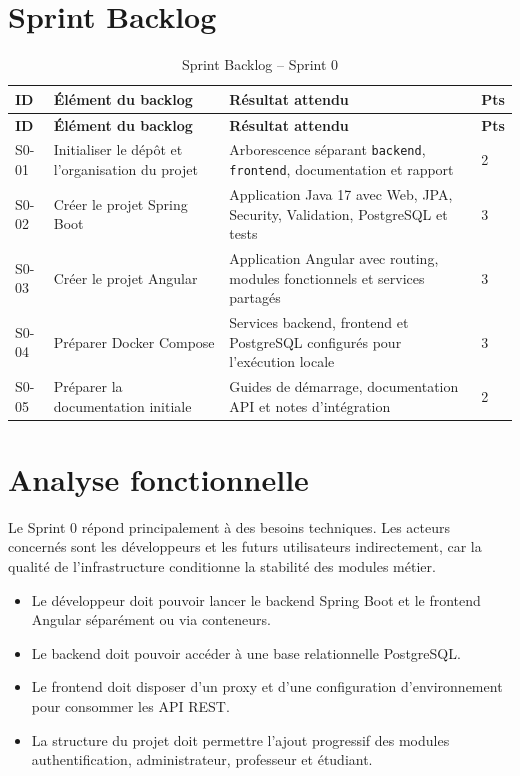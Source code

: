 \documentclass[12pt,a4paper]{report}
\begin{document}
\section{Sprint Backlog}

\begin{longtable}{|p{1.6cm}|p{6cm}|p{5.6cm}|p{1.4cm}|}
\caption{Sprint Backlog -- Sprint 0}\\
\hline
\textbf{ID} & \textbf{Élément du backlog} & \textbf{Résultat attendu} & \textbf{Pts} \\
\hline
\endfirsthead
\hline
\textbf{ID} & \textbf{Élément du backlog} & \textbf{Résultat attendu} & \textbf{Pts} \\
\hline
\endhead
S0-01 & Initialiser le dépôt et l'organisation du projet & Arborescence séparant \texttt{backend}, \texttt{frontend}, documentation et rapport & 2 \\
\hline
S0-02 & Créer le projet Spring Boot & Application Java 17 avec Web, JPA, Security, Validation, PostgreSQL et tests & 3 \\
\hline
S0-03 & Créer le projet Angular & Application Angular avec routing, modules fonctionnels et services partagés & 3 \\
\hline
S0-04 & Préparer Docker Compose & Services backend, frontend et PostgreSQL configurés pour l'exécution locale & 3 \\
\hline
S0-05 & Préparer la documentation initiale & Guides de démarrage, documentation API et notes d'intégration & 2 \\
\hline
\end{longtable}

\section{Analyse fonctionnelle}

Le Sprint 0 répond principalement à des besoins techniques. Les acteurs concernés sont les développeurs et les futurs utilisateurs indirectement, car la qualité de l'infrastructure conditionne la stabilité des modules métier.

\begin{itemize}[itemsep=0.4em]
    \item Le développeur doit pouvoir lancer le backend Spring Boot et le frontend Angular séparément ou via conteneurs.
    \item Le backend doit pouvoir accéder à une base relationnelle PostgreSQL.
    \item Le frontend doit disposer d'un proxy et d'une configuration d'environnement pour consommer les API REST.
    \item La structure du projet doit permettre l'ajout progressif des modules authentification, administrateur, professeur et étudiant.
\end{itemize}
\end{document}
